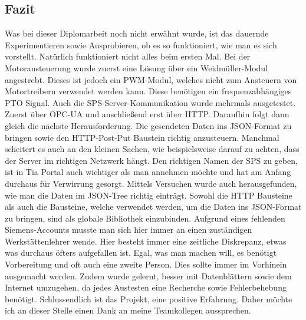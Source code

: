 \subsection{Fazit}
Was bei dieser Diplomarbeit noch nicht erwähnt wurde, ist das dauernde Experimentieren sowie Ausprobieren, ob es so funktioniert, wie man es sich vorstellt. Natürlich funktioniert nicht alles beim ersten Mal. Bei der Motoransteuerung wurde zuerst eine Lösung über ein Weidmüller-Modul angestrebt. Dieses ist jedoch ein PWM-Modul, welches nicht zum Ansteuern von Motortreibern verwendet werden kann. Diese benötigen ein frequenzabhängiges PTO Signal. Auch die SPS-Server-Kommunikation wurde mehrmals ausgetestet. Zuerst über OPC-UA und anschließend erst über HTTP. Daraufhin folgt dann gleich die nächste Herausforderung. Die gesendeten Daten ins JSON-Format zu bringen sowie den HTTP-Post-Put Baustein richtig anzusteuern. Manchmal scheitert es auch an den kleinen Sachen, wie beispielsweise darauf zu achten, dass der Server im richtigen Netzwerk hängt. Den richtigen Namen der SPS zu geben, ist in Tia Portal auch wichtiger als man annehmen möchte und hat am Anfang durchaus für Verwirrung gesorgt. Mittels Versuchen wurde auch herausgefunden, wie man die Daten im JSON-Tree richtig einträgt. Sowohl die HTTP Bausteine als auch die Bausteine, welche verwendet werden, um die Daten ins JSON-Format zu bringen, sind als globale Bibliothek einzubinden. Aufgrund eines fehlenden Siemens-Accounts musste man sich hier immer an einen zuständigen Werkstättenlehrer wende. Hier besteht immer eine zeitliche Diskrepanz, etwas was durchaus öfters aufgefallen ist. Egal, was man machen will, es benötigt Vorbereitung und oft auch eine zweite Person. Dies sollte immer im Vorhinein ausgemacht werden. Zudem wurde gelernt, besser mit Datenblättern sowie dem Internet umzugehen, da jedes Austesten eine Recherche sowie Fehlerbehebung benötigt. Schlussendlich ist das Projekt, eine positive Erfahrung. Daher möchte ich an dieser Stelle einen Dank an meine Teamkollegen aussprechen.

